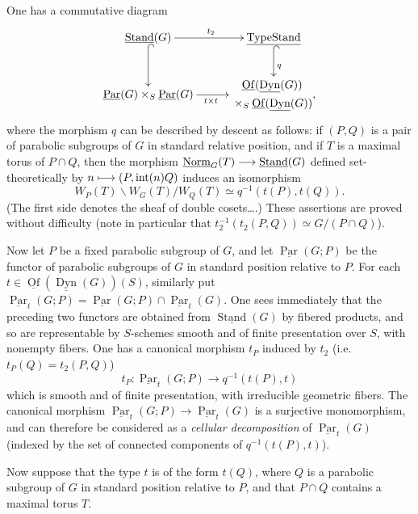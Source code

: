 One has a commutative diagram
\[
\xymatrix@C=28pt@R=25pt{
\underline{\operatorname{Stand}}(G)\ar[r]^{t_2}\ar@{^{(}->}[d]&\underline{\operatorname{TypeStand}}\ar@{^{(}->}[d]^q\\
\underline{\operatorname{Par}}(G)\times_S\underline{\operatorname{Par}}(G)\ar[r]_{t\times t}&{\begin{gathered}\underline{\operatorname{Of}}(\underline{\operatorname{Dyn}}(G))\\{}\times_S\underline{\operatorname{Of}}(\underline{\operatorname{Dyn}}(G))\end{gathered}},
}
\]
where the morphism $q$ can be described by descent as follows: if $(P,Q)$ is a pair of parabolic subgroups of $G$ in standard relative position, and if $T$ is a maximal torus of $P\cap Q$, then the morphism $\underline{\mathrm{Norm}}_G(T)\longrightarrow\underline{\operatorname{Stand}}(G)$ defined set-theoretically by $n\longmapsto(P,\operatorname{int}(n)Q)$ induces an isomorphism
\[
W_P(T)\backslash W_G(T)/W_Q(T)\simeq q^{-1}(t(P),t(Q)).
\]
(The first side denotes the sheaf of double cosets\ldots.) These assertions are proved without difficulty (note in particular that $t_2^{-1}(t_2(P,Q))\simeq G/(P\cap Q)$).

\label{XXVI.4.5.4}
Now let $P$ be a fixed parabolic subgroup of $G$, and let $\underline{\operatorname{Par}}(G;P)$ be the functor of parabolic subgroups of $G$ in standard position relative to $P$. For each $t\in\underline{\operatorname{Of}}(\underline{\operatorname{Dyn}}(G))(S)$, similarly put $\underline{\operatorname{Par}}_t(G;P)=\underline{\operatorname{Par}}(G;P)\cap\underline{\operatorname{Par}}_t(G)$. One sees immediately that the preceding two functors are obtained from $\underline{\operatorname{Stand}}(G)$ by fibered products, and so are representable by $S$-schemes smooth and of finite presentation over $S$, with nonempty fibers. One has a canonical morphism $t_P$ induced by $t_2$ (i.e.~$t_P(Q)=t_2(P,Q)$)
\[
t_P:\underline{\operatorname{Par}}_t(G;P)\to q^{-1}(t(P),t)
\]
which is smooth and of finite presentation, with irreducible geometric fibers. The canonical morphism $\underline{\operatorname{Par}}_t(G;P)\to\underline{\operatorname{Par}}_t(G)$ is a surjective monomorphism, and can therefore be considered as a \emph{cellular decomposition} of $\underline{\operatorname{Par}}_t(G)$ (indexed by the set of connected components of $q^{-1}(t(P),t)$).

\label{XXVI.4.5.5}
Now suppose that the type $t$ is of the form $t(Q)$, where $Q$ is a parabolic subgroup of $G$ in standard position relative to $P$, and that $P\cap Q$ contains a maximal torus $T$.

